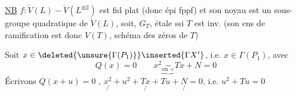 \uline{NB} $f:\check V(L)\mathbin{-}\check V(L^{\otimes2})$ est fid plat (donc épi fppf) et son noyau est un sous-groupe  quadratique de $\check V(L)$, soit,  $G_T$, étale ssi $T$ est inv. (son ens de ramification est donc $V(T)$, schéma des zéros de $T$)

Soit $x\in\deleted{\unsure{\Gamma(P_1)}}\inserted{\Gamma X'}$, i.e. $x\in\Gamma(P_1)$, avec
\[
Q(x)=0\qquad x^2\underset{\underbrace{\text{ou }+}}{-}Tx+N=0
\]
Écrivons $Q(x+u)=0$ , \quad $\underset{/}{x^2}+u^2+\underset{/}{Tx}+Tu+\underset{/}{N}=0$, i.e. $u^2+Tu=0$
